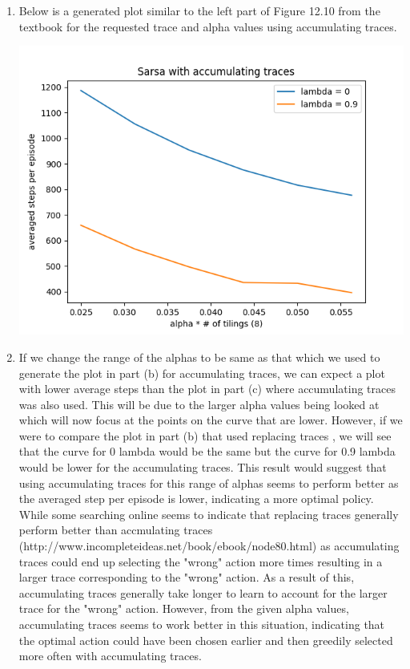 \documentclass[11pt]{article}
\begin{document}
\begin{enumerate}[label=(\alph*)]
\item
Below is a generated plot similar to the left part of Figure 12.10 from the textbook for the requested trace and alpha values using accumulating traces.

\includegraphics[scale=0.8]{accumulating_traces.png}

\item
If we change the range of the alphas to be same as that which we used to generate the plot in part (b) for accumulating traces, we can expect a plot with lower average steps than the plot in part (c) where accumulating traces was also used. This will be due to the larger alpha values being looked at which will now focus at the points on the curve that are lower. However, if we were to compare the plot in part (b) that used replacing traces , we will see that the curve for 0 lambda would be the same but the curve for 0.9 lambda would be lower for the accumulating traces. This result would suggest that using accumulating traces for this range of alphas seems to perform better as the averaged step per episode is lower, indicating a more optimal policy. While some searching online seems to indicate that replacing traces generally perform better than accmulating traces (http://www.incompleteideas.net/book/ebook/node80.html) as accumulating traces could end up selecting the "wrong" action more times resulting in a larger trace corresponding to the "wrong" action. As a result of this, accumulating traces generally take longer to learn to account for the larger trace for the "wrong" action. However, from the given alpha values, accumulating traces seems to work better in this situation, indicating that the optimal action could have been chosen earlier and then greedily selected more often with accumulating traces.

\end{enumerate}
\end{document}
